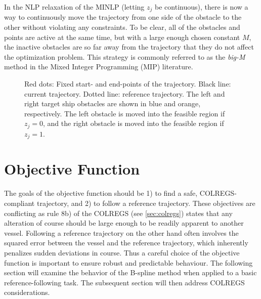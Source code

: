 In the NLP relaxation of the MINLP (letting $z_j$ be continuous), there is now a way to continuously move the trajectory from one side of the obstacle to the other without violating any constraints. To be clear, all of the obstacles and points are active at the same time, but with a large enough chosen constant $M$, the inactive obstacles are so far away from the trajectory that they do not affect the optimization problem. This strategy is commonly referred to as the \emph{big-M} method in the Mixed Integer Programming (MIP) literature.

\begin{figure}
    \centering
    
    \caption{Red dots: Fixed start- and end-points of the trajectory. Black line: current trajectory. Dotted line: reference trajectory. The left and right target ship obstacles are shown in blue and orange, respectively. The left obstacle is moved into the feasible region if $z_j = 0$, and the right obstacle is moved into the feasible region if $z_j = 1$.}
    \label{fig:non-convex-obstacle-mi}
\end{figure}



\section{Objective Function}
The goals of the objective function should be 1) to find a safe, COLREGS-compliant trajectory, and 2) to follow a reference trajectory. These objectives are conflicting as rule 8b) of the COLREGS (see \cref{sec:colregs}) states that any alteration of course should be large enough to be readily apparent to another vessel. Following a reference trajectory on the other hand often involves the squared error between the vessel and the reference trajectory, which inherently penalizes sudden deviations in course. 
Thus a careful choice of the objective function is important to ensure robust and predictable behaviour. 
The following section will examine the behavior of the B-spline method when applied to a basic reference-following task. The subsequent section will then address COLREGS considerations.



